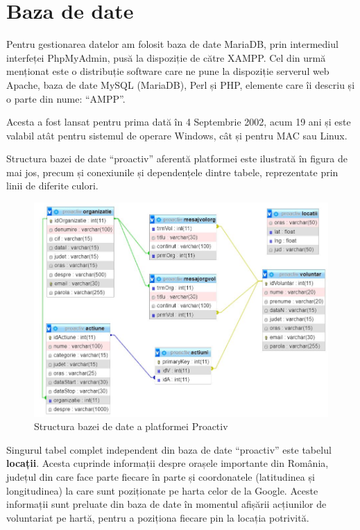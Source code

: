 \documentclass[12pt,a4paper]{report}
\begin{document}
\chapter{Baza de date}
\par
Pentru gestionarea datelor am folosit baza de date MariaDB, prin intermediul interfeței PhpMyAdmin, pusă la dispoziție de către XAMPP. Cel din urmă menționat este o distribuție software care ne pune la dispoziție serverul web Apache, baza de date MySQL (MariaDB), Perl și PHP, elemente care îi descriu și o parte din nume: “AMPP”. 
\par
Acesta a fost lansat pentru prima dată în 4 Septembrie 2002, acum 19 ani și este valabil atât pentru sistemul de operare Windows, cât și pentru MAC sau Linux.
\\\par
Structura bazei de date “proactiv” aferentă platformei este ilustrată în figura de mai jos, precum și conexiunile și dependențele dintre tabele, reprezentate prin linii de diferite culori.
\\
\begin{figure}[H]
\centering
  \includegraphics[width=1\linewidth]{./imagini/bazadate.jpg}
  \caption{Structura bazei de date a platformei Proactiv}
\end{figure}
\par
Singurul tabel complet independent din baza de date “proactiv” este tabelul \textbf{locații}. Acesta cuprinde informații despre orașele importante din România, județul din care face parte fiecare în parte și coordonatele (latitudinea și longitudinea) la care sunt poziționate pe harta celor de la Google. Aceste informații sunt preluate din baza de date în momentul afișării acțiunilor de voluntariat pe hartă, pentru a poziționa fiecare pin la locația potrivită.
\end{document}
